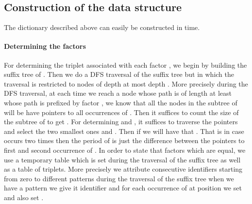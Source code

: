 \documentclass{article}
\newcommand{\?}{\mskip1.5mu}
\begin{document}
\subsection{Construction of the data structure}
The dictionary described above can easily be constructed in  time. 
\paragraph{Determining the factors}
For determining the triplet  associated with each factor , we begin by building the suffix tree of . Then we do a DFS 	traversal of the suffix tree but in which the traversal is restricted to nodes of depth at most depth . More precisely during the DFS traversal, at each time we reach a node  whose path is of length at least  whose path is prefixed by factor , we know that all the nodes in the subtree of  will be have pointers to all occurrences of . Then it suffices to count the size of the subtree of  to get . For determining  and , it suffices to traverse the pointers and select the two smallest ones  and . Then if  we will have that . That is in case  occurs two times then the period of  is just the difference between the pointers to first and second occurrence of . In order to state that factors which are equal, we use a temporary table  which is set during the traversal of the suffix tree as well as a table  of triplets. More precisely we attribute consecutive identifiers starting from zero to different patterns during the traversal of the suffix tree when we have a pattern  we give it identifier  and for each occurrence of  at position  we set  and also set .
\end{document}
